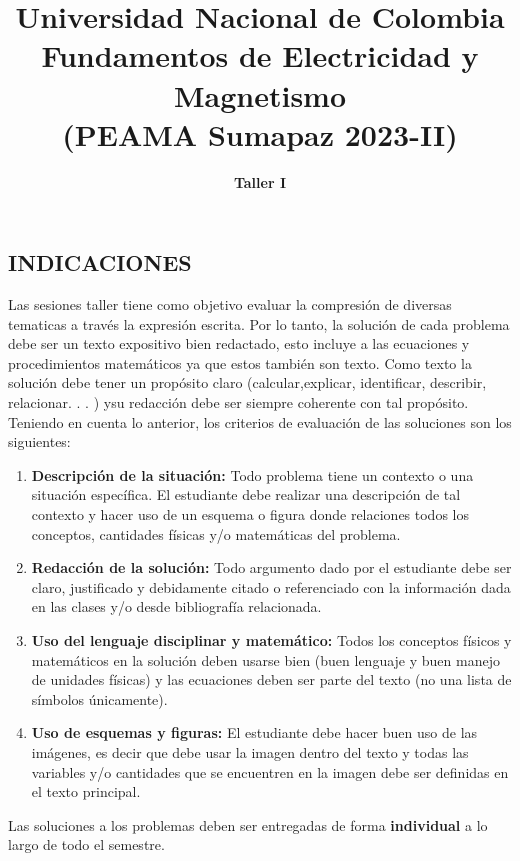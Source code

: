 \documentclass{article}
\title{Universidad Nacional de Colombia\\ Fundamentos de Electricidad y Magnetismo\\ (PEAMA Sumapaz 2023-II)} %
\author{\textbf{Taller I}} %
\begin{document}
\maketitle

\renewcommand{\tablename}{Tabla}

\subsection*{INDICACIONES}
Las sesiones taller tiene como objetivo evaluar la compresión de diversas tematicas a través la expresión escrita. Por lo tanto, la solución de cada problema debe ser un texto expositivo bien redactado, esto incluye a las ecuaciones y procedimientos matemáticos ya que estos también son texto. Como texto la solución debe tener un propósito claro (calcular,explicar, identificar, describir, relacionar. . . ) ysu redacción debe ser siempre coherente con tal propósito.\\

Teniendo en cuenta lo anterior, los criterios de evaluación de las soluciones son los siguientes:
\begin{enumerate}[label=\roman*)]
\item  \textbf{Descripción de la situación:} Todo problema tiene un contexto o una situación específica. El estudiante debe realizar una descripción de tal contexto y hacer uso de un esquema o figura donde relaciones todos los conceptos, cantidades físicas y/o matemáticas del problema.
\item \textbf{Redacción de la solución:} Todo argumento dado por el estudiante debe ser claro, justificado y debidamente citado o referenciado con la información dada en las clases y/o desde bibliografía relacionada.
\item \textbf{Uso del lenguaje disciplinar y matemático:} Todos los conceptos físicos y matemáticos en la solución deben usarse bien (buen lenguaje y buen manejo de unidades físicas) y las ecuaciones deben ser parte del texto (no una lista de símbolos únicamente).
\item \textbf{Uso de esquemas y figuras:} El estudiante debe hacer buen uso de las imágenes, es decir que debe usar la imagen dentro del texto y todas las variables y/o cantidades que se encuentren en la imagen debe ser definidas en el texto principal.
\end{enumerate}

Las soluciones a los problemas deben ser entregadas de forma \textbf{individual} a lo largo de todo el semestre. 
\end{document}
